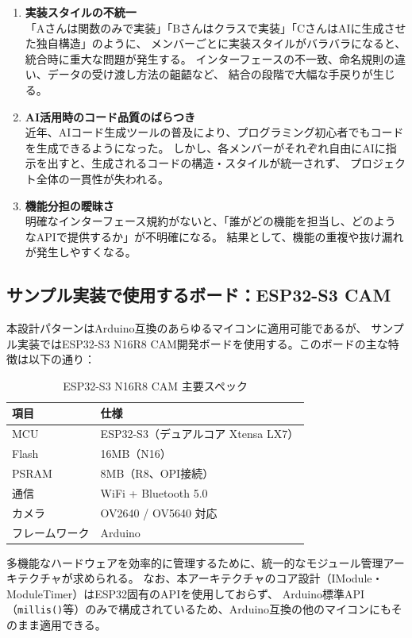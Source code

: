 \begin{enumerate}
    \item \textbf{実装スタイルの不統一} \\
    「Aさんは関数のみで実装」「Bさんはクラスで実装」「CさんはAIに生成させた独自構造」のように、
    メンバーごとに実装スタイルがバラバラになると、統合時に重大な問題が発生する。
    インターフェースの不一致、命名規則の違い、データの受け渡し方法の齟齬など、
    結合の段階で大幅な手戻りが生じる。

    \item \textbf{AI活用時のコード品質のばらつき} \\
    近年、AIコード生成ツールの普及により、プログラミング初心者でもコードを生成できるようになった。
    しかし、各メンバーがそれぞれ自由にAIに指示を出すと、生成されるコードの構造・スタイルが統一されず、
    プロジェクト全体の一貫性が失われる。

    \item \textbf{機能分担の曖昧さ} \\
    明確なインターフェース規約がないと、「誰がどの機能を担当し、どのようなAPIで提供するか」が不明確になる。
    結果として、機能の重複や抜け漏れが発生しやすくなる。
\end{enumerate}

\subsection{サンプル実装で使用するボード：ESP32-S3 CAM}

本設計パターンはArduino互換のあらゆるマイコンに適用可能であるが、
サンプル実装ではESP32-S3 N16R8 CAM開発ボードを使用する。このボードの主な特徴は以下の通り：

\begin{table}[h]
\centering
\begin{tabularx}{0.8\textwidth}{l X}
\toprule
\textbf{項目} & \textbf{仕様} \\
\midrule
MCU & ESP32-S3（デュアルコア Xtensa LX7） \\
Flash & 16MB（N16） \\
PSRAM & 8MB（R8、OPI接続） \\
通信 & WiFi + Bluetooth 5.0 \\
カメラ & OV2640 / OV5640 対応 \\
フレームワーク & Arduino \\
\bottomrule
\end{tabularx}
\caption{ESP32-S3 N16R8 CAM 主要スペック}
\end{table}

多機能なハードウェアを効率的に管理するために、統一的なモジュール管理アーキテクチャが求められる。
なお、本アーキテクチャのコア設計（IModule・ModuleTimer）はESP32固有のAPIを使用しておらず、
Arduino標準API（\texttt{millis()}等）のみで構成されているため、Arduino互換の他のマイコンにもそのまま適用できる。

